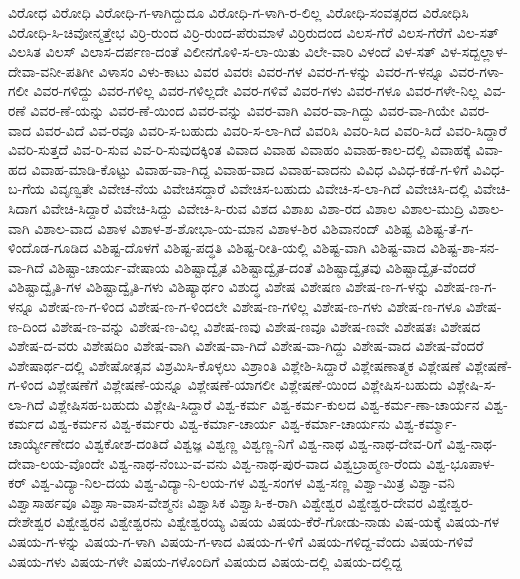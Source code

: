 ವಿರೋಧ
ವಿರೋಧಿ
ವಿರೋಧಿ-ಗ-ಳಾಗಿದ್ದುದೂ
ವಿರೋಧಿ-ಗ-ಳಾಗಿ-ರ-ಲಿಲ್ಲ
ವಿರೋಧಿ-ಸಂವತ್ಸರದ
ವಿರೋಧಿಸಿ
ವಿರೋಧಿ-ಸಿ-ಚಿವೋನ್ಮತ್ತೇಭ
ವಿರ್ರಿ-ರುಂದ
ವಿರ್ರಿ-ರುಂದ-ಪೆರುಮಾಳೆ
ವಿರ್ರಿರುದಂದ
ವಿಲಸ-ಗೆರೆ
ವಿಲಸ-ಗೆರೆಗೆ
ವಿಲ-ಸತ್
ವಿಲಸಿತ
ವಿಲಸ್
ವಿಲಾಸ-ದರ್ಪಣ-ದಂತೆ
ವಿಲೀನಗೊಳಿ-ಸ-ಲಾ-ಯಿತು
ವಿಲೇ-ವಾರಿ
ವಿಳಂದೆ
ವಿಳ-ಸತ್
ವಿಳ-ಸದ್ಬಲ್ಲಾಳ-ದೇವಾ-ವನೀ-ಪತಿಗೀ
ವಿಳಾಸಂ
ವಿಳು-ಕಾಟು
ವಿವರ
ವಿವರಃ
ವಿವರ-ಗಳ
ವಿವರ-ಗ-ಳನ್ನು
ವಿವರ-ಗ-ಳನ್ನೂ
ವಿವರ-ಗಳಾ-ಗಲೀ
ವಿವರ-ಗಳಿದ್ದು
ವಿವರ-ಗಳಿಲ್ಲ
ವಿವರ-ಗಳಿಲ್ಲದೇ
ವಿವರ-ಗಳಿವೆ
ವಿವರ-ಗಳು
ವಿವರ-ಗಳೂ
ವಿವರ-ಗಳೇ-ನಿಲ್ಲ
ವಿವ-ರಣೆ
ವಿವರ-ಣೆ-ಯನ್ನು
ವಿವರ-ಣೆ-ಯಿಂದ
ವಿವರ-ವನ್ನು
ವಿವರ-ವಾಗಿ
ವಿವರ-ವಾ-ಗಿದ್ದು
ವಿವರ-ವಾ-ಗಿಯೇ
ವಿವರ-ವಾದ
ವಿವರ-ವಿದೆ
ವಿವ-ರವೂ
ವಿವರಿ-ಸ-ಬಹುದು
ವಿವರಿ-ಸ-ಲಾ-ಗಿದೆ
ವಿವರಿಸಿ
ವಿವರಿ-ಸಿದ
ವಿವರಿ-ಸಿದೆ
ವಿವರಿ-ಸಿದ್ದಾರೆ
ವಿವರಿ-ಸುತ್ತದೆ
ವಿವ-ರಿ-ಸುವ
ವಿವ-ರಿ-ಸುವುದಕ್ಕಿಂತ
ವಿವಾದ
ವಿವಾಹ
ವಿವಾಹಂ
ವಿವಾಹ-ಕಾಲ-ದಲ್ಲಿ
ವಿವಾಹಕ್ಕೆ
ವಿವಾ-ಹದ
ವಿವಾಹ-ಮಾಡಿ-ಕೊಟ್ಟು
ವಿವಾಹ-ವಾ-ಗಿದ್ದ
ವಿವಾಹ-ವಾದ
ವಿವಾಹ-ವಾದನು
ವಿವಿಧ
ವಿವಿಧ-ಕಡೆ-ಗ-ಳಿಗೆ
ವಿವಿಧ-ಬ-ಗೆಯ
ವಿವೃಣ್ವತೇ
ವಿವೇಚ-ನೆಯ
ವಿವೇಚಿಸದ್ದಾರೆ
ವಿವೇಚಿಸ-ಬಹುದು
ವಿವೇಚಿ-ಸ-ಲಾ-ಗಿದೆ
ವಿವೇಚಿಸಿ-ದಲ್ಲಿ
ವಿವೇಚಿ-ಸಿದಾಗ
ವಿವೇಚಿ-ಸಿದ್ದಾರೆ
ವಿವೇಚಿ-ಸಿದ್ದು
ವಿವೇಚಿ-ಸಿ-ರುವ
ವಿಶದ
ವಿಶಾಖ
ವಿಶಾ-ರದ
ವಿಶಾಲ
ವಿಶಾಲ-ಮುದ್ರಿ
ವಿಶಾಲ-ವಾಗಿ
ವಿಶಾಲ-ವಾದ
ವಿಶಾಳ
ವಿಶಾಳ-ಶ-ಶೋಭಾ-ಯ-ಮಾನ
ವಿಶಾಳ-ಶಿರ
ವಿಶಿವಾನಂದ್
ವಿಶಿಷ್ಟ
ವಿಶಿಷ್ಟ-ತೆ-ಗ-ಳಿಂದೊಡ-ಗೂಡಿದ
ವಿಶಿಷ್ಟ-ದೊಳಗೆ
ವಿಶಿಷ್ಟ-ಪದ್ಧತಿ
ವಿಶಿಷ್ಟ-ರೀತಿ-ಯಲ್ಲಿ
ವಿಶಿಷ್ಟ-ವಾಗಿ
ವಿಶಿಷ್ಟ-ವಾದ
ವಿಶಿಷ್ಟ-ಶಾ-ಸನ-ವಾ-ಗಿದೆ
ವಿಶಿಷ್ಟಾ-ಚಾರ್ಯ-ವೇಷಾಯ
ವಿಶಿಷ್ಟಾದ್ವೈತ
ವಿಶಿಷ್ಟಾದ್ವೈತ-ದಂತೆ
ವಿಶಿಷ್ಟಾದ್ವೈತವು
ವಿಶಿಷ್ಟಾದ್ವೈತ-ವೆಂದರೆ
ವಿಶಿಷ್ಟಾದ್ವೈತಿ-ಗಳ
ವಿಶಿಷ್ಟಾದ್ವೈತಿ-ಗಳು
ವಿಶಿಷ್ಯಾರ್ಥಂ
ವಿಶುದ್ಧ
ವಿಶೇಷ
ವಿಶೇಷಣ
ವಿಶೇಷ-ಣ-ಗ-ಳನ್ನು
ವಿಶೇಷ-ಣ-ಗ-ಳನ್ನೂ
ವಿಶೇಷ-ಣ-ಗ-ಳಿಂದ
ವಿಶೇಷ-ಣ-ಗ-ಳಿಂದಲೇ
ವಿಶೇಷ-ಣ-ಗಳಿಲ್ಲ
ವಿಶೇಷ-ಣ-ಗಳು
ವಿಶೇಷ-ಣ-ಗಳೂ
ವಿಶೇಷ-ಣ-ದಿಂದ
ವಿಶೇಷ-ಣ-ವನ್ನು
ವಿಶೇಷ-ಣ-ವಿಲ್ಲ
ವಿಶೇಷ-ಣವು
ವಿಶೇಷ-ಣವೂ
ವಿಶೇಷ-ಣವೇ
ವಿಶೇಷತಃ
ವಿಶೇಷದ
ವಿಶೇಷ-ದ-ವರು
ವಿಶೇಷದಿಂ
ವಿಶೇಷ-ವಾಗಿ
ವಿಶೇಷ-ವಾ-ಗಿದೆ
ವಿಶೇಷ-ವಾ-ಗಿದ್ದು
ವಿಶೇಷ-ವಾದ
ವಿಶೇಷ-ವೆಂದರೆ
ವಿಶೇಷಾರ್ಥ-ದಲ್ಲಿ
ವಿಶೇಷೋತ್ಸವ
ವಿಶ್ರಮಿಸಿ-ಕೊಳ್ಳಲು
ವಿಶ್ರಾಂತಿ
ವಿಶ್ಲೇಶಿ-ಸಿದ್ದಾರೆ
ವಿಶ್ಲೇಷಣಾತ್ಮಕ
ವಿಶ್ಲೇಷಣೆ
ವಿಶ್ಲೇಷಣೆ-ಗ-ಳಿಂದ
ವಿಶ್ಲೇಷಣೆಗೆ
ವಿಶ್ಲೇಷಣೆ-ಯನ್ನೂ
ವಿಶ್ಲೇಷಣೆ-ಯಾಗಲೀ
ವಿಶ್ಲೇಷಣೆ-ಯಿಂದ
ವಿಶ್ಲೇಷಿಸ-ಬಹುದು
ವಿಶ್ಲೇಷಿ-ಸ-ಲಾ-ಗಿದೆ
ವಿಶ್ಲೇಷಿಸಹ-ಬಹುದು
ವಿಶ್ಲೇಷಿ-ಸಿದ್ದಾರೆ
ವಿಶ್ವ-ಕರ್ಮ
ವಿಶ್ವ-ಕರ್ಮ-ಕುಲದ
ವಿಶ್ವ-ಕರ್ಮ-ಣಾ-ಚಾರ್ಯನ
ವಿಶ್ವ-ಕರ್ಮದ
ವಿಶ್ವ-ಕರ್ಮನ
ವಿಶ್ವ-ಕರ್ಮರು
ವಿಶ್ವ-ಕರ್ಮಾ-ಚಾರ್ಯ
ವಿಶ್ವ-ಕರ್ಮಾ-ಚಾರ್ಯನು
ವಿಶ್ವ-ಕರ್ಮ್ಮಾ-ಚಾರ್ಯ್ಯೇಣೇದಂ
ವಿಶ್ವಕೋಶ-ದಂತಿದೆ
ವಿಶ್ವಜ್ಞ
ವಿಶ್ವಣ್ಣ
ವಿಶ್ವಣ್ಣ-ನಿಗೆ
ವಿಶ್ವ-ನಾಥ
ವಿಶ್ವ-ನಾಥ-ದೇವ-ರಿಗೆ
ವಿಶ್ವ-ನಾಥ-ದೇವಾ-ಲಯ-ವೊಂದೇ
ವಿಶ್ವ-ನಾಥ-ನೆಂಬು-ವ-ವನು
ವಿಶ್ವ-ನಾಥ-ಪುರ-ವಾದ
ವಿಶ್ವಬ್ರಾಹ್ಮಣ-ರೆಂದು
ವಿಶ್ವ-ಭೂಪಾಳ-ಕರ್
ವಿಶ್ವ-ವಿದ್ಯಾ-ನಿಲ-ದಯ
ವಿಶ್ವ-ವಿದ್ಯಾ-ನಿ-ಲಯ-ಗಳ
ವಿಶ್ವ-ಸಂಗಳ
ವಿಶ್ವ-ಸಣ್ಣ
ವಿಶ್ವಾ-ಮಿತ್ರ
ವಿಶ್ವಾ-ವನಿ
ವಿಶ್ವಾಸಾರ್ಹವೂ
ವಿಶ್ವಾಸಾ-ವಾಸ-ವೇಶ್ಮನಃ
ವಿಶ್ವಾಸಿಕ
ವಿಶ್ವಾಸಿ-ಕ-ರಾಗಿ
ವಿಶ್ವೇಶ್ವರ
ವಿಶ್ವೇಶ್ವರ-ದೇವರ
ವಿಶ್ವೇಶ್ವರ-ದೇಶೇಶ್ವರ
ವಿಶ್ವೇಶ್ವರನ
ವಿಶ್ವೇಶ್ವರನು
ವಿಶ್ವೇಶ್ವರಯ್ಯ
ವಿಷಯ
ವಿಷಯ-ಕೆರೆ-ಗೋಡು-ನಾಡು
ವಿಷ-ಯಕ್ಕೆ
ವಿಷಯ-ಗಳ
ವಿಷಯ-ಗ-ಳನ್ನು
ವಿಷಯ-ಗ-ಳಾಗಿ
ವಿಷಯ-ಗ-ಳಾದ
ವಿಷಯ-ಗ-ಳಿಗೆ
ವಿಷಯ-ಗಳಿದ್ದ-ವೆಂದು
ವಿಷಯ-ಗಳಿವೆ
ವಿಷಯ-ಗಳು
ವಿಷಯ-ಗಳೇ
ವಿಷಯ-ಗಳೊಂದಿಗೆ
ವಿಷಯದ
ವಿಷಯ-ದಲ್ಲಿ
ವಿಷಯ-ದಲ್ಲಿದ್ದ
